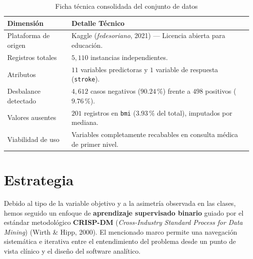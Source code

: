\documentclass[12pt,a4paper]{article}
\begin{document}
\begin{table}[H]
\centering
\small
\caption{Ficha técnica consolidada del conjunto de datos}
\label{tab:resumen_dataset}
\begin{tabularx}{\textwidth}{@{}l L@{}}
\toprule
\textbf{Dimensión} & \textbf{Detalle Técnico} \\
\midrule
Plataforma de origen & Kaggle (\textit{fedesoriano}, 2021) --- Licencia abierta para educación. \\
Registros totales & $5{,}110$ instancias independientes. \\
Atributos & $11$ variables predictoras y $1$ variable de respuesta (\texttt{stroke}). \\
Desbalance detectado & $4{,}612$ casos negativos ($90.24\,\%$) frente a $498$ positivos ($9.76\,\%$). \\
Valores ausentes & $201$ registros en \texttt{bmi} ($3.93\,\%$ del total), imputados por mediana. \\
Viabilidad de uso & Variables completamente recabables en consulta médica de primer nivel. \\
\bottomrule
\end{tabularx}
\end{table}

\section{Estrategia}

Debido al tipo de la variable objetivo y a la asimetría observada en las clases, hemos seguido un enfoque de \textbf{aprendizaje supervisado binario} guiado por el estándar metodológico \textbf{CRISP-DM} (\textit{Cross-Industry Standard Process for Data Mining}) (Wirth \& Hipp, 2000). El mencionado marco permite una navegación sistemática e iterativa entre el entendimiento del problema desde un punto de vista clínico y el diseño del software analítico.
\end{document}
